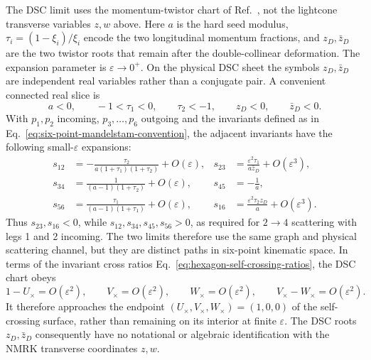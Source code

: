 \documentclass[a4paper,11pt]{article}
\begin{document}
The DSC limit uses the momentum-twistor chart of
Ref.~\cite{Duhr:2025lyg}, not the lightcone transverse variables \(z,w\)
above.  Here \(a\) is the hard seed modulus,
\(\tau_i=(1-\xi_i)/\xi_i\) encode the two longitudinal momentum fractions,
and \(z_D,\bar z_D\) are the two twistor roots that remain after the
double-collinear deformation.  The expansion parameter is
\(\varepsilon\to0^+\).  On the physical DSC sheet the symbols
\(z_D,\bar z_D\) are independent real variables rather than a conjugate
pair.  A convenient connected real slice is
\begin{equation}
 a<0,\qquad -1<\tau_1<0,\qquad \tau_2<-1,\qquad
 z_D<0,\qquad \bar z_D<0.
 \label{eq:dsc-domain-example}
\end{equation}
With \(p_1,p_2\) incoming, \(p_3,\ldots,p_6\) outgoing and the invariants
defined as in Eq.~\eqref{eq:six-point-mandelstam-convention}, the adjacent
invariants have the following small-\(\varepsilon\) expansions:
\begin{align}
 s_{12}&=-\frac{\tau_2}{a(1+\tau_1)(1+\tau_2)}+O(\varepsilon),&
 s_{23}&=\frac{\varepsilon^2\tau_1}{a\bar z_D}+O(\varepsilon^3),\nonumber\\
 s_{34}&=\frac{1}{(a-1)(1+\tau_2)}+O(\varepsilon),&
 s_{45}&=-\frac1a,\nonumber\\
 s_{56}&=\frac{\tau_1}{(a-1)(1+\tau_1)}+O(\varepsilon),&
 s_{16}&=\frac{\varepsilon^2\tau_2z_D}{a}+O(\varepsilon^3).
 \label{eq:dsc-invariants-example}
\end{align}
Thus \(s_{23},s_{16}<0\), while
\(s_{12},s_{34},s_{45},s_{56}>0\), as required for \(2\to4\) scattering
with legs 1 and 2 incoming.  The two limits therefore use the same graph and
physical scattering channel, but they are distinct paths in six-point
kinematic space.  In terms of the invariant cross ratios
Eq.~\eqref{eq:hexagon-self-crossing-ratios}, the DSC chart obeys
\begin{equation}
 1-U_\times=O(\varepsilon^2),\qquad
 V_\times=O(\varepsilon^2),\qquad
 W_\times=O(\varepsilon^2),\qquad
 V_\times-W_\times=O(\varepsilon^2).
 \label{eq:dsc-self-crossing-endpoint}
\end{equation}
It therefore approaches the endpoint
\((U_\times,V_\times,W_\times)=(1,0,0)\) of the self-crossing surface,
rather than remaining on its interior at finite \(\varepsilon\).  The DSC
roots \(z_D,\bar z_D\) consequently have no notational or algebraic
identification with the NMRK transverse coordinates \(z,w\).
\end{document}
